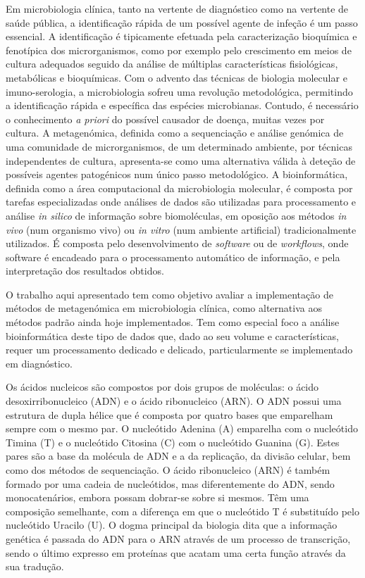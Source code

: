 Em microbiologia clínica, tanto na vertente de diagnóstico como na vertente de saúde pública, a identificação rápida de um possível agente de infeção é um passo essencial. A identificação é tipicamente efetuada pela caracterização bioquímica e fenotípica dos microrganismos, como por exemplo pelo crescimento em meios de cultura adequados seguido da análise de múltiplas características fisiológicas, metabólicas e bioquímicas. Com o advento das técnicas de biologia molecular e imuno-serologia, a microbiologia sofreu uma revolução metodológica, permitindo a identificação rápida e específica das espécies microbianas. Contudo, é necessário o conhecimento \textit{a priori} do possível causador de doença, muitas vezes por cultura. A metagenómica, definida como a sequenciação e análise genómica de uma comunidade de microrganismos, de um determinado ambiente, por técnicas independentes de cultura, apresenta-se como uma alternativa válida à deteção de possíveis agentes patogénicos num único passo metodológico. A bioinformática, definida como a área computacional da microbiologia molecular, é composta por tarefas especializadas onde análises de dados são utilizadas para processamento e análise \textit{in silico} de informação sobre biomoléculas, em oposição aos métodos \textit{in vivo} (num organismo vivo) ou \textit{in vitro} (num ambiente artificial) tradicionalmente utilizados. É composta pelo desenvolvimento de \textit{software} ou de \textit{workflows}, onde software é encadeado para o processamento automático de informação, e pela interpretação dos resultados obtidos.

O trabalho aqui apresentado tem como objetivo avaliar a implementação de métodos de metagenómica em microbiologia clínica, como alternativa aos métodos padrão ainda hoje implementados. Tem como especial foco a análise bioinformática deste tipo de dados que, dado ao seu volume e características, requer um processamento dedicado e delicado, particularmente se implementado em diagnóstico. 

Os ácidos nucleicos são compostos por dois grupos de moléculas: o ácido desoxirribonucleico (ADN) e o ácido ribonucleico (ARN). O ADN possui uma estrutura de dupla hélice que é composta por quatro bases que emparelham sempre com o mesmo par. O nucleótido Adenina (A) emparelha com o nucleótido Timina (T) e o nucleótido Citosina (C) com o nucleótido Guanina (G). Estes pares são a base da molécula de ADN e a da replicação, da divisão celular, bem como dos métodos de sequenciação. O ácido ribonucleico (ARN) é também formado por uma cadeia de nucleótidos, mas diferentemente do ADN, sendo monocatenários, embora possam dobrar-se sobre si mesmos. Têm uma composição semelhante, com a diferença em que o nucleótido T é substituído pelo nucleótido Uracilo (U). O dogma principal da biologia dita que a informação genética é passada do ADN para o ARN através de um processo de transcrição, sendo o último expresso em proteínas que acatam uma certa função através da sua tradução. 


